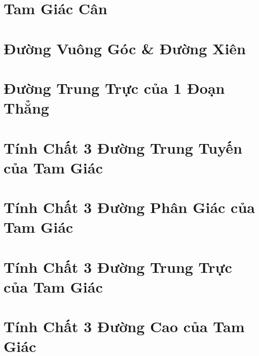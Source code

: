 \documentclass{article}
\begin{document}

\section{Tam Giác Cân}


\section{Đường Vuông Góc \& Đường Xiên}


\section{Đường Trung Trực của 1 Đoạn Thẳng}


\section{Tính Chất 3 Đường Trung Tuyến của Tam Giác}


\section{Tính Chất 3 Đường Phân Giác của Tam Giác}


\section{Tính Chất 3 Đường Trung Trực của Tam Giác}


\section{Tính Chất 3 Đường Cao của Tam Giác}


\printbibliography[heading=bibintoc]
	
\end{document}
